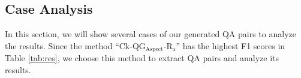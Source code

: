 \subsection{Case Analysis}
\label{sec:analysis}
In this section, we will show several cases of our generated QA pairs to analyze the results.
Since the method ``Ck-QG$_\text{Aspect}$-$\text{R}_\text{a}$'' has the highest F1 scores in Table \ref{tab:res}, we choose this method to extract QA pairs and analyze its results.
